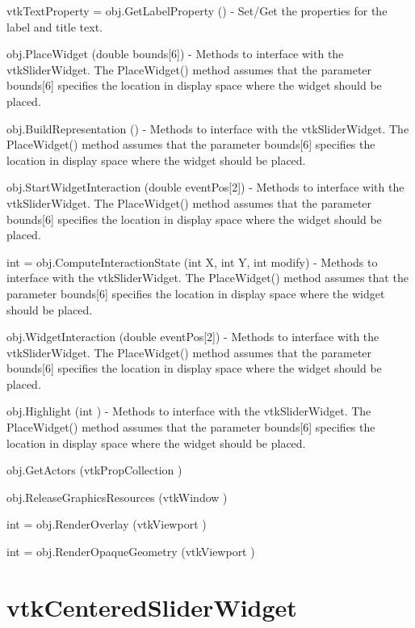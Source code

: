 \begin{DoxyItemize}
\item {\ttfamily vtk\-Text\-Property = obj.\-Get\-Label\-Property ()} -\/ Set/\-Get the properties for the label and title text.  
\item {\ttfamily obj.\-Place\-Widget (double bounds\mbox{[}6\mbox{]})} -\/ Methods to interface with the vtk\-Slider\-Widget. The Place\-Widget() method assumes that the parameter bounds\mbox{[}6\mbox{]} specifies the location in display space where the widget should be placed.  
\item {\ttfamily obj.\-Build\-Representation ()} -\/ Methods to interface with the vtk\-Slider\-Widget. The Place\-Widget() method assumes that the parameter bounds\mbox{[}6\mbox{]} specifies the location in display space where the widget should be placed.  
\item {\ttfamily obj.\-Start\-Widget\-Interaction (double event\-Pos\mbox{[}2\mbox{]})} -\/ Methods to interface with the vtk\-Slider\-Widget. The Place\-Widget() method assumes that the parameter bounds\mbox{[}6\mbox{]} specifies the location in display space where the widget should be placed.  
\item {\ttfamily int = obj.\-Compute\-Interaction\-State (int X, int Y, int modify)} -\/ Methods to interface with the vtk\-Slider\-Widget. The Place\-Widget() method assumes that the parameter bounds\mbox{[}6\mbox{]} specifies the location in display space where the widget should be placed.  
\item {\ttfamily obj.\-Widget\-Interaction (double event\-Pos\mbox{[}2\mbox{]})} -\/ Methods to interface with the vtk\-Slider\-Widget. The Place\-Widget() method assumes that the parameter bounds\mbox{[}6\mbox{]} specifies the location in display space where the widget should be placed.  
\item {\ttfamily obj.\-Highlight (int )} -\/ Methods to interface with the vtk\-Slider\-Widget. The Place\-Widget() method assumes that the parameter bounds\mbox{[}6\mbox{]} specifies the location in display space where the widget should be placed.  
\item {\ttfamily obj.\-Get\-Actors (vtk\-Prop\-Collection )}  
\item {\ttfamily obj.\-Release\-Graphics\-Resources (vtk\-Window )}  
\item {\ttfamily int = obj.\-Render\-Overlay (vtk\-Viewport )}  
\item {\ttfamily int = obj.\-Render\-Opaque\-Geometry (vtk\-Viewport )}  
\end{DoxyItemize}\hypertarget{vtkwidgets_vtkcenteredsliderwidget}{}\section{vtk\-Centered\-Slider\-Widget}\label{vtkwidgets_vtkcenteredsliderwidget}

